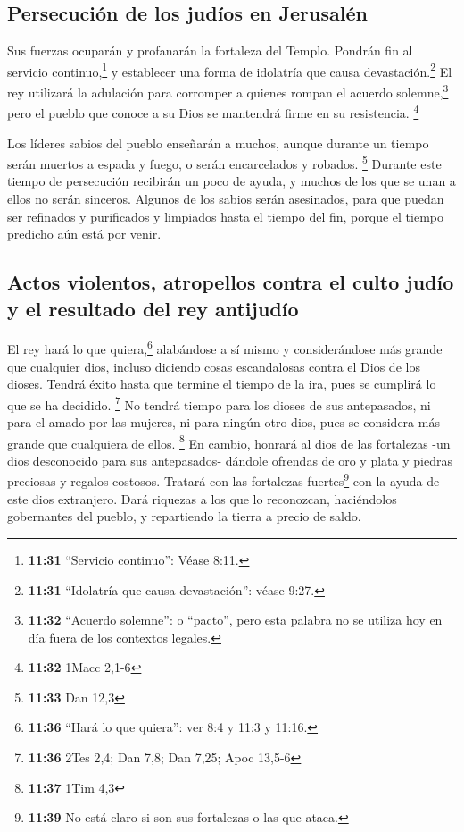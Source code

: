 \hypertarget{persecuciuxf3n-de-los-juduxedos-en-jerusaluxe9n}{%
\subsection{Persecución de los judíos en
Jerusalén}\label{persecuciuxf3n-de-los-juduxedos-en-jerusaluxe9n}}

 Sus fuerzas ocuparán y profanarán la fortaleza del
Templo. Pondrán fin al servicio continuo,\footnote{\textbf{11:31}
  ``Servicio continuo'': Véase 8:11.} y establecer una forma de
idolatría que causa devastación.\footnote{\textbf{11:31} ``Idolatría que
  causa devastación'': véase 9:27.}  El rey utilizará la
adulación para corromper a quienes rompan el acuerdo solemne,\footnote{\textbf{11:32}
  ``Acuerdo solemne'': o ``pacto'', pero esta palabra no se utiliza hoy
  en día fuera de los contextos legales.} pero el pueblo que conoce a su
Dios se mantendrá firme en su resistencia. \footnote{\textbf{11:32}
  1Macc 2,1-6}

 Los líderes sabios del pueblo enseñarán a muchos, aunque
durante un tiempo serán muertos a espada y fuego, o serán encarcelados y
robados. \footnote{\textbf{11:33} Dan 12,3}  Durante este
tiempo de persecución recibirán un poco de ayuda, y muchos de los que se
unan a ellos no serán sinceros.  Algunos de los sabios
serán asesinados, para que puedan ser refinados y purificados y
limpiados hasta el tiempo del fin, porque el tiempo predicho aún está
por venir.

\hypertarget{actos-violentos-atropellos-contra-el-culto-juduxedo-y-el-resultado-del-rey-antijuduxedo}{%
\subsection{Actos violentos, atropellos contra el culto judío y el
resultado del rey
antijudío}\label{actos-violentos-atropellos-contra-el-culto-juduxedo-y-el-resultado-del-rey-antijuduxedo}}

 El rey hará lo que quiera,\footnote{\textbf{11:36}
  ``Hará lo que quiera'': ver 8:4 y 11:3 y 11:16.} alabándose a sí mismo
y considerándose más grande que cualquier dios, incluso diciendo cosas
escandalosas contra el Dios de los dioses. Tendrá éxito hasta que
termine el tiempo de la ira, pues se cumplirá lo que se ha decidido.
\footnote{\textbf{11:36} 2Tes 2,4; Dan 7,8; Dan 7,25; Apoc 13,5-6}
 No tendrá tiempo para los dioses de sus antepasados, ni
para el amado por las mujeres, ni para ningún otro dios, pues se
considera más grande que cualquiera de ellos. \footnote{\textbf{11:37}
  1Tim 4,3}  En cambio, honrará al dios de las fortalezas
-un dios desconocido para sus antepasados- dándole ofrendas de oro y
plata y piedras preciosas y regalos costosos.  Tratará
con las fortalezas fuertes\footnote{\textbf{11:39} No está claro si son
  sus fortalezas o las que ataca.} con la ayuda de este dios extranjero.
Dará riquezas a los que lo reconozcan, haciéndolos gobernantes del
pueblo, y repartiendo la tierra a precio de saldo.

